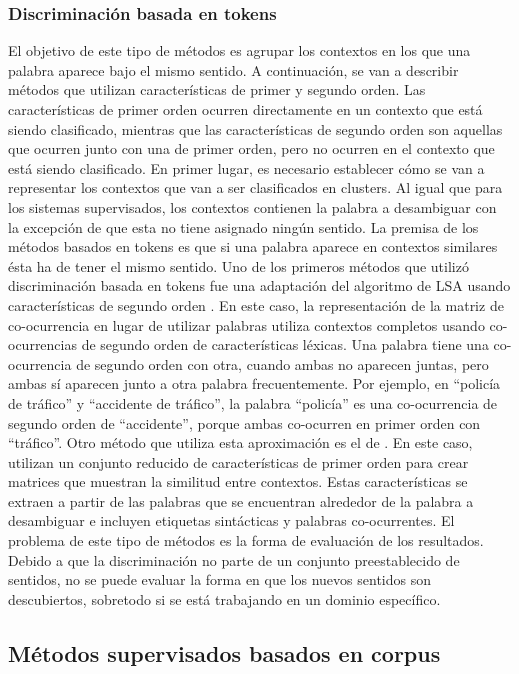 \subsubsection*{Discriminación basada en tokens}

El objetivo de este tipo de métodos es agrupar los contextos en los que una palabra aparece bajo el mismo sentido. A continuación, se van a describir métodos que utilizan características de primer y segundo orden. Las características de primer orden ocurren directamente en un contexto que está siendo clasificado, mientras que las características de segundo orden son aquellas que ocurren junto con una de primer orden, pero no ocurren en el contexto que está siendo clasificado. En primer lugar, es necesario establecer cómo se van a representar los contextos que van a ser clasificados en clusters. Al igual que para los sistemas supervisados, los contextos contienen la palabra a desambiguar con la excepción de que esta no tiene asignado ningún sentido. La premisa de los métodos basados en tokens es que si una palabra aparece en contextos similares ésta ha de tener el mismo sentido.
Uno de los primeros métodos que utilizó discriminación basada en tokens fue una adaptación del algoritmo de LSA usando características de segundo orden \cite{009}. En este caso, la representación de la matriz de co-ocurrencia en lugar de utilizar palabras utiliza contextos completos usando co-ocurrencias de segundo orden de características léxicas. Una palabra tiene una co-ocurrencia de segundo orden con otra, cuando ambas no aparecen juntas, pero ambas sí aparecen junto a otra palabra frecuentemente. Por ejemplo, en “policía de tráfico” y “accidente de tráfico”, la palabra “policía” es una co-ocurrencia de segundo orden de “accidente”, porque ambas co-ocurren en primer orden con “tráfico”. Otro método que utiliza esta aproximación es el de \cite{015}. En este caso, utilizan un conjunto reducido de características de primer orden para crear matrices que muestran la similitud entre contextos. Estas características se extraen a partir de las palabras que se encuentran alrededor de la palabra a desambiguar e incluyen etiquetas sintácticas y palabras co-ocurrentes.
El problema de este tipo de métodos es la forma de evaluación de los resultados. Debido a que la discriminación no parte de un conjunto preestablecido de sentidos, no se puede evaluar la forma en que los nuevos sentidos son descubiertos, sobretodo si se está trabajando en un dominio específico.

\subsection{Métodos supervisados basados en corpus}

